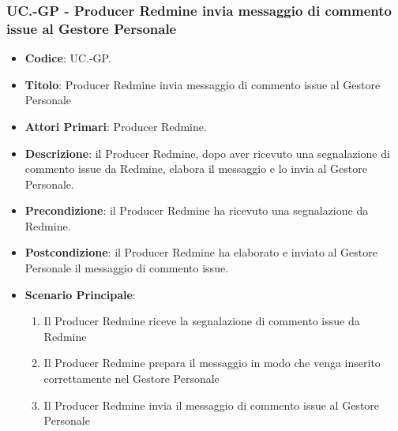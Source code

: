 	\subsubsection{UC\theuccount.\thesubuccount-GP - Producer Redmine invia messaggio di commento issue al Gestore Personale}
	\begin{itemize}
		\item \textbf{Codice}: UC\theuccount.\thesubuccount-GP.
		\item \textbf{Titolo}: Producer Redmine invia messaggio di commento issue al Gestore Personale
		\item \textbf{Attori Primari}: Producer Redmine.
		\item \textbf{Descrizione}: il Producer Redmine, dopo aver ricevuto una segnalazione di commento issue da Redmine, elabora il messaggio e lo invia al Gestore Personale.
		\item \textbf{Precondizione}: il Producer Redmine ha ricevuto una segnalazione da Redmine.
		\item \textbf{Postcondizione}: il Producer Redmine ha elaborato e inviato al Gestore Personale il messaggio di commento issue.
		\item \textbf{Scenario Principale}:
		\begin{enumerate}
			\item Il Producer Redmine riceve la segnalazione di commento issue da Redmine
			\item Il Producer Redmine prepara il messaggio in modo che venga inserito correttamente nel Gestore Personale
			\item Il Producer Redmine invia il messaggio di	commento issue al Gestore Personale
		\end{enumerate}
	\end{itemize}
